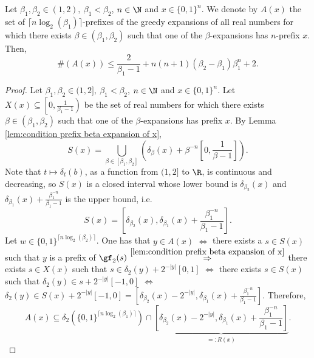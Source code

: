 \begin{lemma}\label{lem:generalization bounding candidates greedy expansion}
	Let $\beta_1,\beta_2 \in (1,2), \ \beta_1 < \beta_2$, $n \in \N$ and $x \in \{0,1\}^n$. We denote by $A(x)$ the set of $\lceil n \log_2(\beta_1)\rceil$-prefixes of the greedy expansions of all real numbers for which there exists $\beta \in (\beta_1,\beta_2)$ such that one of the $\beta$-expansions has $n$-prefix $x$. Then,
	\begin{equation}
		\#\left(A(x)\right) \leq \frac{2}{\beta_1 - 1} + n(n+1)(\beta_2 - \beta_1)\beta_1^{n} + 2.
	\end{equation}
\end{lemma}
\begin{proof}
	Let $\beta_1,\beta_2 \in (1,2], \ \beta_1 < \beta_2$, $n \in \N$ and $x \in \{0,1\}^n$. Let $X(x) \subseteq \left[0, \frac{1}{\beta_1 - 1}\right)$ be the set of real numbers for which there exists $\beta \in (\beta_1,\beta_2)$ such that one of the $\beta$-expansions has prefix $x$. By Lemma \ref{lem:condition prefix beta expansion of x}, 
	\begin{equation}
		S(x) = \bigcup_{\beta \in [\beta_1,\beta_2]} \left(\delta_\beta(x) + \beta^{-n}\left[0,\frac{1}{\beta - 1}\right]\right).
	\end{equation}
	Note that $t \mapsto \delta_t(b)$, as a function from $(1,2]$ to $\R$, is continuous and decreasing, so $S(x)$ is a closed interval whose lower bound is $\delta_{\beta_2}(x)$ and $\delta_{\beta_1}(x) + \frac{\beta_1^{-n}}{\beta_1-1}$ is the upper bound, i.e.
	\begin{equation}
		S(x) = \left[\delta_{\beta_2}(x),\delta_{\beta_1}(x) + \frac{\beta_1^{-n}}{\beta_1 - 1}\right].
	\end{equation}
	Let $w \in \{0,1\}^{\lceil n \log_2(\beta_2)\rceil}$. One has that $y \in A(x)$ $\Leftrightarrow$ there exists a $s \in S(x)$ such that $y$ is a prefix of $\gf_2(s)$ $\overset{\ref{lem:condition prefix beta expansion of x}}{\Rightarrow}$ there exists $s \in X(x)$ such that $s \in \delta_2(y) + 2^{-|y|}\left[0,1\right]$ $\Leftrightarrow$ there exists $s \in S(x)$ such that $\delta_2(y) \in s + 2^{-|y|}\left[-1, 0\right]$ $\Leftrightarrow$ $\delta_2(y) \in S(x) + 2^{-|y|}\left[-1, 0\right] = \left[\delta_{\beta_2}(x)- 2^{-|y|},\delta_{\beta_1}(x) + \frac{\beta_1^{-n}}{\beta_1 - 1}\right]$. Therefore,
	\begin{equation}
		A(x) \subseteq \delta_2\left(\{0,1\}^{\lceil n \log_2(\beta_1)\rceil}\right) \cap \underset{=: R(x)}{\underbrace{\left[\delta_{\beta_2}(x)- 2^{-|y|},\delta_{\beta_1}(x) + \frac{\beta_1^{-n}}{\beta_1 - 1}\right]}}.

\end{equation}
\end{proof}
